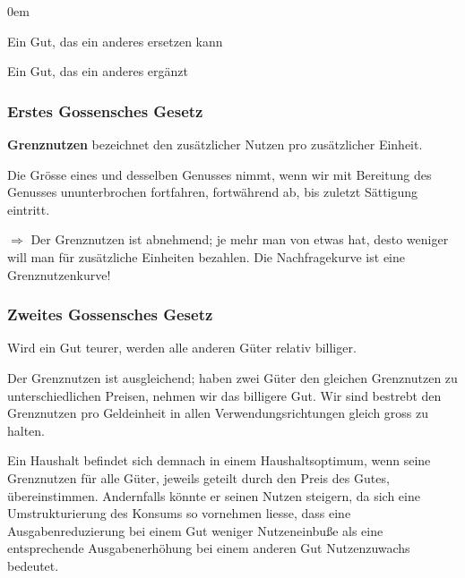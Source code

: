 \begin{description}\itemsep0em
	\item [Substitutionsgut] Ein Gut, das ein anderes ersetzen kann
	\item [Komplemtärgut] Ein Gut, das ein anderes ergänzt
\end{description}

\subsubsection{Erstes Gossensches Gesetz}
\textbf{Grenznutzen} bezeichnet den zusätzlicher Nutzen pro zusätzlicher Einheit.

Die Grösse eines und desselben Genusses nimmt, wenn wir mit Bereitung des Genusses ununterbrochen fortfahren, 
fortwährend ab, bis zuletzt Sättigung eintritt.

$\Rightarrow$ Der Grenznutzen ist abnehmend; je mehr man von etwas hat, desto weniger will man für zusätzliche Einheiten
bezahlen. Die Nachfragekurve ist eine Grenznutzenkurve!

\subsubsection{Zweites Gossensches Gesetz}
Wird ein Gut teurer, werden alle anderen Güter relativ billiger. 

Der Grenznutzen ist ausgleichend; haben zwei Güter den gleichen Grenznutzen zu unterschiedlichen Preisen,
nehmen wir das billigere Gut. Wir sind bestrebt den Grenznutzen pro Geldeinheit in allen Verwendungsrichtungen
gleich gross zu halten.

Ein Haushalt befindet sich demnach in einem Haushaltsoptimum, wenn seine Grenznutzen für alle Güter, 
jeweils geteilt durch den Preis des Gutes, übereinstimmen. 
Andernfalls könnte er seinen Nutzen steigern, da sich eine Umstrukturierung des Konsums so vornehmen liesse, 
dass eine Ausgabenreduzierung bei einem Gut weniger Nutzeneinbuße als eine entsprechende Ausgabenerhöhung 
bei einem anderen Gut Nutzenzuwachs bedeutet.
